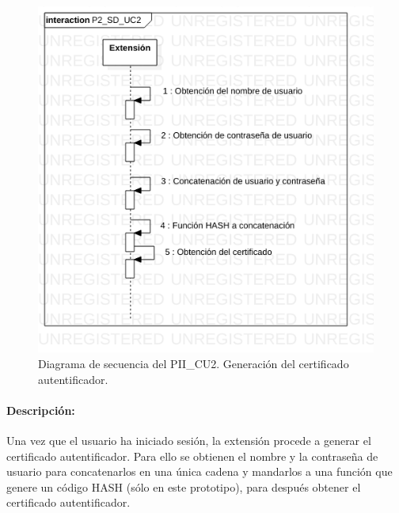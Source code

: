 \documentclass[12pt, a4paper, titlepage]{report}
\begin{document}
    			\begin{figure}[H]
    				\begin{center}    		    	\includegraphics[width=15cm]{./imagenes/Desarrollo/Prototipo_2/P2_SD_UC2.png}
    				\caption[Diagrama de secuencia 2 del Prototipo II]{Diagrama de secuencia del PII\_CU2. Generación del certificado autentificador.}
    				\end{center}
    			\end{figure}
    			
    			\paragraph{Descripción:}
    			Una vez que el usuario ha iniciado sesión, la extensión procede a generar el certificado autentificador. Para ello se obtienen el nombre y la contraseña de usuario para concatenarlos en una única cadena y mandarlos a una función que genere un código HASH (sólo en este prototipo), para después obtener el certificado autentificador.
    			
\end{document}
